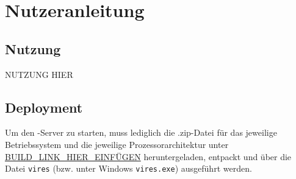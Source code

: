 \section{Nutzeranleitung}
\subsection{Nutzung}
NUTZUNG HIER

\subsection{Deployment}
Um den \vires-Server zu starten, muss lediglich die .zip-Datei für das jeweilige Betriebssystem und die jeweilige Prozessorarchitektur unter 
\url{BUILD_LINK_HIER_EINFÜGEN} heruntergeladen, entpackt und über die Datei \verb+vires+ (bzw. unter Windows \verb+vires.exe+) ausgeführt werden.

